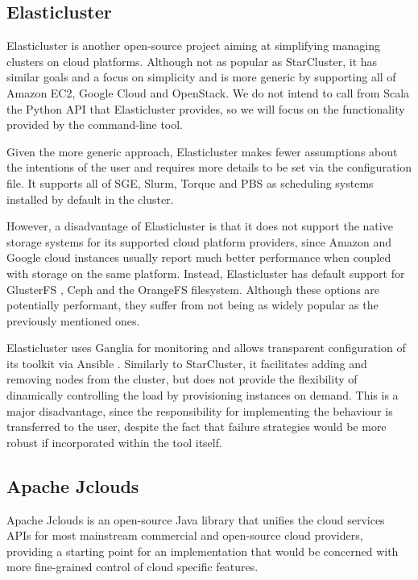 \subsection{Elasticluster}

Elasticluster \cite{Elasticluster} is another open-source project aiming at simplifying managing clusters on cloud platforms. Although not as popular as StarCluster, it has similar goals and a focus on simplicity and is more generic by supporting all of Amazon EC2, Google Cloud and OpenStack. We do not intend to call from Scala the Python API that Elasticluster provides, so we will focus on the functionality provided by the command-line tool.

Given the more generic approach, Elasticluster makes fewer assumptions about the intentions of the user and requires more details to be set via the configuration file. It supports all of SGE, Slurm, Torque and PBS as scheduling systems installed by default in the cluster.

However, a disadvantage of Elasticluster is that it does not support the native storage systems for its supported cloud platform providers, since Amazon and Google cloud instances usually report much better performance when coupled with storage on the same platform. Instead, Elasticluster has default support for GlusterFS \cite{GlusterFS}, Ceph \cite{Ceph} and the OrangeFS \cite{OrangeFS} filesystem. Although these options are potentially performant, they suffer from not being as widely popular as the previously mentioned ones.

Elasticluster uses Ganglia \cite{Ganglia} for monitoring and allows transparent configuration of its toolkit via Ansible \cite{Ansible}. Similarly to StarCluster, it facilitates adding and removing nodes from the cluster, but does not provide the flexibility of dinamically controlling the load by provisioning instances on demand. This is a major disadvantage, since the responsibility for implementing the behaviour is transferred to the user, despite the fact that failure strategies would be more robust if incorporated within the tool itself.

\subsection{Apache Jclouds}

Apache Jclouds \cite{jclouds} is an open-source Java library that unifies the cloud services APIs for most mainstream commercial and open-source cloud providers, providing a starting point for an implementation that would be concerned with more fine-grained control of cloud specific features.

